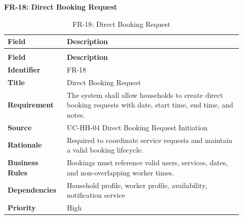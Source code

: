 \documentclass[12pt,a4paper]{article}
\begin{document}
\noindent\textbf{FR-18: Direct Booking Request}\par
\vspace{4pt}
\begingroup\small\setlength{\tabcolsep}{4pt}\renewcommand{\arraystretch}{1.15}
\begin{longtable}{|>{\raggedright\arraybackslash}p{0.22\linewidth}|>{\raggedright\arraybackslash}p{0.70\linewidth}|}
\caption{FR-18: Direct Booking Request}\label{tab:fr-18}\\
\hline
\textbf{Field} & \textbf{Description} \\ \hline
\endfirsthead
\multicolumn{2}{c}{Table \thetable\ Direct Booking Request (continued)}\\
\hline
\textbf{Field} & \textbf{Description} \\ \hline
\endhead
\textbf{Identifier} & FR-18 \\ \hline
\textbf{Title} & Direct Booking Request \\ \hline
\textbf{Requirement} & The system shall allow households to create direct booking requests with date, start time, end time, and notes. \\ \hline
\textbf{Source} & UC-HH-04 Direct Booking Request Initiation \\ \hline
\textbf{Rationale} & Required to coordinate service requests and maintain a valid booking lifecycle. \\ \hline
\textbf{Business Rules} & Bookings must reference valid users, services, dates, and non-overlapping worker times. \\ \hline
\textbf{Dependencies} & Household profile, worker profile, availability, notification service \\ \hline
\textbf{Priority} & High \\ \hline
\end{longtable}
\endgroup
\clearpage
\end{document}
